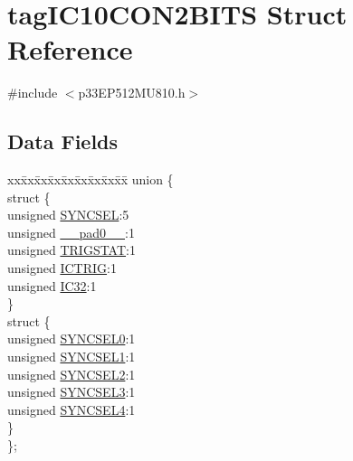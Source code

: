 \hypertarget{structtag_i_c10_c_o_n2_b_i_t_s}{}\section{tag\+I\+C10\+C\+O\+N2\+B\+I\+TS Struct Reference}
\label{structtag_i_c10_c_o_n2_b_i_t_s}


{\ttfamily \#include $<$p33\+E\+P512\+M\+U810.\+h$>$}

\subsection*{Data Fields}
\begin{DoxyCompactItemize}
\item 
\begin{tabbing}
xx\=xx\=xx\=xx\=xx\=xx\=xx\=xx\=xx\=\kill
union \{\\
\>struct \{\\
\>\>unsigned \hyperlink{structtag_i_c10_c_o_n2_b_i_t_s_a35fbbe11485c2615ed27535b62c3fa35}{SYNCSEL}:5\\
\>\>unsigned \hyperlink{structtag_i_c10_c_o_n2_b_i_t_s_adf71f3d8410c1f1dbbc96680a92c49af}{\_\_pad0\_\_}:1\\
\>\>unsigned \hyperlink{structtag_i_c10_c_o_n2_b_i_t_s_ab379549de54ac93ad4aa73686c34cb7c}{TRIGSTAT}:1\\
\>\>unsigned \hyperlink{structtag_i_c10_c_o_n2_b_i_t_s_a79bd14cfd2e403f3a96ce0b3bb58097b}{ICTRIG}:1\\
\>\>unsigned \hyperlink{structtag_i_c10_c_o_n2_b_i_t_s_afc705120246cb4ca0c93c87817519b7f}{IC32}:1\\
\>\} \\
\>struct \{\\
\>\>unsigned \hyperlink{structtag_i_c10_c_o_n2_b_i_t_s_a3b5df3154fde5141e6ac0156425ff8b4}{SYNCSEL0}:1\\
\>\>unsigned \hyperlink{structtag_i_c10_c_o_n2_b_i_t_s_a50e73f95ab1c258ddc64f69c0991deaf}{SYNCSEL1}:1\\
\>\>unsigned \hyperlink{structtag_i_c10_c_o_n2_b_i_t_s_a304907a5d2c4cbf1114a54642a85951e}{SYNCSEL2}:1\\
\>\>unsigned \hyperlink{structtag_i_c10_c_o_n2_b_i_t_s_a6bbd1bd2ead6c9fa713969c6eb0f0c75}{SYNCSEL3}:1\\
\>\>unsigned \hyperlink{structtag_i_c10_c_o_n2_b_i_t_s_a0cd5bbe196c7974953909d27a6307bb7}{SYNCSEL4}:1\\
\>\} \\
\}; \\

\end{tabbing}\end{DoxyCompactItemize}



